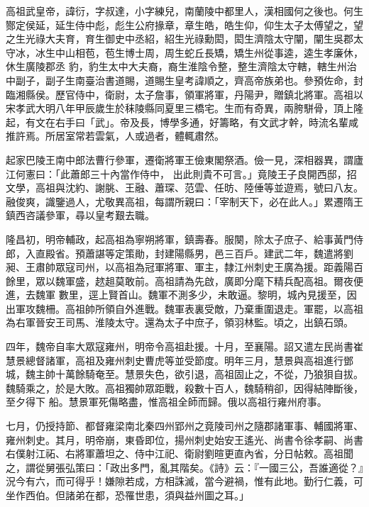 
\begin{pinyinscope}

 高祖武皇帝，諱衍，字叔達，小字練兒，南蘭陵中都里人，漢相國何之後也。何生酂定侯延，延生侍中彪，彪生公府掾章，章生皓，皓生仰，仰生太子太傅望之，望之生光祿大夫育，育生御史中丞紹，紹生光祿勳閎，閎生濟陰太守闡，闡生吳郡太守冰，冰生中山相苞，苞生博士周，周生蛇丘長矯，矯生州從事逵，逵生孝廉休，休生廣陵郡丞
 豹，豹生太中大夫裔，裔生淮陰令整，整生濟陰太守轄，轄生州治中副子，副子生南臺治書道賜，道賜生皇考諱順之，齊高帝族弟也。參預佐命，封臨湘縣侯。歷官侍中，衛尉，太子詹事，領軍將軍，丹陽尹，贈鎮北將軍。高祖以宋孝武大明八年甲辰歲生於秣陵縣同夏里三橋宅。生而有奇異，兩胯駢骨，頂上隆起，有文在右手曰「武」。帝及長，博學多通，好籌略，有文武才幹，時流名輩咸推許焉。所居室常若雲氣，人或過者，體輒肅然。



 起家巴陵王南中郎法曹行參軍，遷衛將軍王儉東閣祭酒。儉一見，深相器異，謂廬江何憲曰：「此蕭郎三十內當作侍中，
 出此則貴不可言。」竟陵王子良開西邸，招文學，高祖與沈約、謝朓、王融、蕭琛、范雲、任昉、陸倕等並遊焉，號曰八友。融俊爽，識鑒過人，尤敬異高祖，每謂所親曰：「宰制天下，必在此人。」累遷隋王鎮西咨議參軍，尋以皇考艱去職。



 隆昌初，明帝輔政，起高祖為寧朔將軍，鎮壽春。服闋，除太子庶子、給事黃門侍郎，入直殿省。預蕭諶等定策勛，封建陽縣男，邑三百戶。建武二年，魏遣將劉昶、王肅帥眾寇司州，以高祖為冠軍將軍、軍主，隸江州刺史王廣為援。距義陽百餘里，眾以魏軍盛，趑趄莫敢前。高祖請為先啟，廣即分麾下精兵配高祖。爾夜便進，去魏軍
 數里，逕上賢首山。魏軍不測多少，未敢逼。黎明，城內見援至，因出軍攻魏柵。高祖帥所領自外進戰。魏軍表裏受敵，乃棄重圍退走。軍罷，以高祖為右軍晉安王司馬、淮陵太守。還為太子中庶子，領羽林監。頃之，出鎮石頭。



 四年，魏帝自率大眾寇雍州，明帝令高祖赴援。十月，至襄陽。詔又遣左民尚書崔慧景總督諸軍，高祖及雍州刺史曹虎等並受節度。明年三月，慧景與高祖進行鄧城，魏主帥十萬餘騎奄至。慧景失色，欲引退，高祖固止之，不從，乃狼狽自拔。魏騎乘之，於是大敗。高祖獨帥眾距戰，殺數十百人，魏騎稍卻，因得結陣斷後，至夕得下
 船。慧景軍死傷略盡，惟高祖全師而歸。俄以高祖行雍州府事。



 七月，仍授持節、都督雍梁南北秦四州郢州之竟陵司州之隨郡諸軍事、輔國將軍、雍州刺史。其月，明帝崩，東昏即位，揚州刺史始安王遙光、尚書令徐孝嗣、尚書右僕射江祏、右將軍蕭坦之、侍中江祀、衛尉劉暄更直內省，分日帖敕。高祖聞之，謂從舅張弘策曰：「政出多門，亂其階矣。《詩》云：『一國三公，吾誰適從？』況今有六，而可得乎！嫌隙若成，方相誅滅，當今避禍，惟有此地。勤行仁義，可坐作西伯。但諸弟在都，恐罹世患，須與益州圖之耳。」




\end{pinyinscope}
